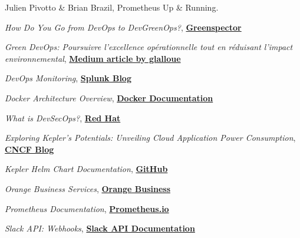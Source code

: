 \documentclass[12pt,a4paper,oneside]{book}
\begin{document}










\appendix


%



\begin{thebibliography}{99}
    
    Julien Pivotto \& Brian Brazil, Prometheus Up \& Running.
    
    \emph{How Do You Go from DevOps to DevGreenOps?},
    \href{https://greenspector.com/en/how-do-you-go-from-devops-to-devgreenops/}{\textbf{Greenspector}}
    
    \emph{Green DevOps: Poursuivre l'excellence opérationnelle tout en réduisant l'impact environnemental},
    \href{https://glalloue.medium.com/green-devops-poursuivre-lexcellence-op%C3%A9rationnelle-tout-en-r%C3%A9duisant-l-impact-environnemental-de500cfcc9eb}{\textbf{Medium article by glalloue}}
    
    \emph{DevOps Monitoring},
    \href{https://www.splunk.com/en_us/blog/learn/devops-monitoring.html}{\textbf{Splunk Blog}}
    
    \emph{Docker Architecture Overview},
    \href{https://docs.docker.com/get-started/overview/#:~:text=with%20fewer%20resources.-,Docker%20architecture,to%20a%20remote%20Docker%20daemon.}{\textbf{Docker Documentation}}
    
    \emph{What is DevSecOps?},
    \href{https://www.redhat.com/en/topics/devops/what-is-devsecops}{\textbf{Red Hat}}
    
    \emph{Exploring Kepler's Potentials: Unveiling Cloud Application Power Consumption},
    \href{https://www.cncf.io/blog/2023/10/11/exploring-keplers-potentials-unveiling-cloud-application-power-consumption/}{\textbf{CNCF Blog}}
    
    \emph{Kepler Helm Chart Documentation},
    \href{https://github.com/sustainable-computing-io/kepler-helm-chart/blob/main/README.md}{\textbf{GitHub}}
    
    \emph{Orange Business Services},
    \href{https://www.orange-business.com/fr}{\textbf{Orange Business}}
    
    \emph{Prometheus Documentation},
    \href{https://prometheus.io/docs}{\textbf{Prometheus.io}}
    
    \emph{Slack API: Webhooks},
    \href{https://api.slack.com/messaging/webhooks}{\textbf{Slack API Documentation}}
    
    \end{thebibliography}
    
\end{document}
